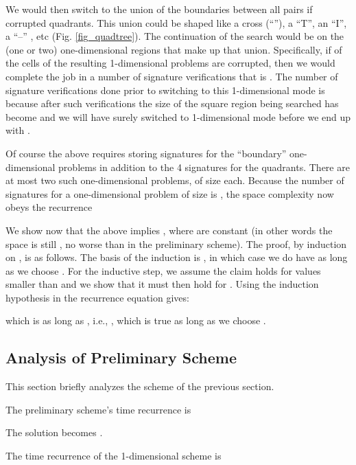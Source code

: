 \documentclass{llncs}
\begin{document}
We would then switch to the union of the 
boundaries between all pairs if corrupted 
quadrants.  This union could be shaped like 
a cross (``''), a ``T'', 
an ``I'', a ``--'' , etc (Fig. \ref{fig_quadtree}).  The continuation
of the search would be on the (one or two) one-dimensional
regions that make up that union. Specifically,
if  of the cells of the resulting 1-dimensional
problems are corrupted, then we would
complete the job in a number of signature
verifications that is .
The number of signature verifications done
prior to switching to this 1-dimensional mode
is  because after
 such verifications the size of the square
region being searched has become 
and we will have surely switched to 1-dimensional
mode before we end up with .

Of course the above requires storing signatures
for the ``boundary'' one-dimensional problems in
addition to the 4 signatures for the quadrants.
There are at most two such one-dimensional
problems, of size  each.
Because the number of signatures for a one-dimensional 
problem of size  is ,
the space complexity now obeys the recurrence





\noindent 
We show now that the above implies ,
where  are constant (in other
words the space is still , no worse
than in the preliminary scheme).  The
proof, by induction on , is
as follows.  The basis of the induction is ,
in which case we do have  as
long as we choose . For
the inductive step, we assume the claim holds
for values smaller than  and we show that it
must then hold for .  Using the induction
hypothesis in the recurrence equation gives:



\noindent which is  as 
long as , 
i.e., , which
is true as long as we choose .

\subsection{Analysis of Preliminary Scheme}
\label{PreliminaryAnalysis}
This section briefly analyzes the scheme of the previous section.

The preliminary scheme's time recurrence is





\noindent The solution becomes .

The time recurrence of the 1-dimensional scheme  is
\end{document}
